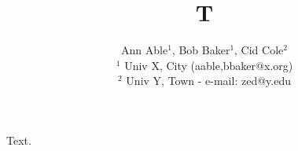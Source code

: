 \documentclass{article}
\begin{document}
\title{T}
\author{Ann Able$^1$, Bob Baker$^1$, Cid Cole$^2$ \\
$^1$ Univ X, City (aable,bbaker@x.org) \\
$^2$ Univ Y, Town - e-mail: zed@y.edu}
\maketitle
Text.
\end{document}
